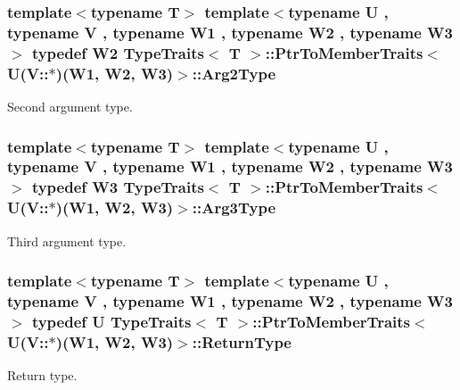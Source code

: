 \subsubsection[{\texorpdfstring{Arg2\+Type}{Arg2Type}}]{\setlength{\rightskip}{0pt plus 5cm}template$<$typename T$>$ template$<$typename U , typename V , typename W1 , typename W2 , typename W3 $>$ typedef W2 {\bf Type\+Traits}$<$ T $>$\+::{\bf Ptr\+To\+Member\+Traits}$<$ U(V\+::$\ast$)(W1, W2, W3)$>$\+::{\bf Arg2\+Type}}\hypertarget{structTypeTraits_1_1PtrToMemberTraits_3_01U_07V_1_1_5_08_07W1_00_01W2_00_01W3_08_4_a93e0a6c1de9ef92609d82976fef7b973}{}\label{structTypeTraits_1_1PtrToMemberTraits_3_01U_07V_1_1_5_08_07W1_00_01W2_00_01W3_08_4_a93e0a6c1de9ef92609d82976fef7b973}
Second argument type. 
\subsubsection[{\texorpdfstring{Arg3\+Type}{Arg3Type}}]{\setlength{\rightskip}{0pt plus 5cm}template$<$typename T$>$ template$<$typename U , typename V , typename W1 , typename W2 , typename W3 $>$ typedef W3 {\bf Type\+Traits}$<$ T $>$\+::{\bf Ptr\+To\+Member\+Traits}$<$ U(V\+::$\ast$)(W1, W2, W3)$>$\+::{\bf Arg3\+Type}}\hypertarget{structTypeTraits_1_1PtrToMemberTraits_3_01U_07V_1_1_5_08_07W1_00_01W2_00_01W3_08_4_aec061b39fafbc200c8375f931391ef70}{}\label{structTypeTraits_1_1PtrToMemberTraits_3_01U_07V_1_1_5_08_07W1_00_01W2_00_01W3_08_4_aec061b39fafbc200c8375f931391ef70}
Third argument type. 
\subsubsection[{\texorpdfstring{Return\+Type}{ReturnType}}]{\setlength{\rightskip}{0pt plus 5cm}template$<$typename T$>$ template$<$typename U , typename V , typename W1 , typename W2 , typename W3 $>$ typedef U {\bf Type\+Traits}$<$ T $>$\+::{\bf Ptr\+To\+Member\+Traits}$<$ U(V\+::$\ast$)(W1, W2, W3)$>$\+::{\bf Return\+Type}}\hypertarget{structTypeTraits_1_1PtrToMemberTraits_3_01U_07V_1_1_5_08_07W1_00_01W2_00_01W3_08_4_a3e5c48fe741bb789a23c4590c93f6bee}{}\label{structTypeTraits_1_1PtrToMemberTraits_3_01U_07V_1_1_5_08_07W1_00_01W2_00_01W3_08_4_a3e5c48fe741bb789a23c4590c93f6bee}
Return type. 


